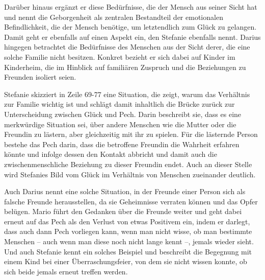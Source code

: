 Darüber hinaus ergänzt er diese Bedürfnisse, die der Mensch aus seiner Sicht hat und nennt die Geborgenheit als zentralen Bestandteil der emotionalen Befindlichkeit, die der Mensch benötige, um letztendlich zum Glück zu gelangen. 
Damit geht er ebenfalls auf einen Aspekt ein, den Stefanie ebenfalls nennt. 
Darius hingegen betrachtet die Bedürfnisse des Menschen aus der Sicht derer, die eine solche Familie nicht besitzen. 
Konkret bezieht er sich dabei auf Kinder im Kinderheim, die im Hinblick auf familiären Zuspruch und die Beziehungen zu Freunden isoliert seien.
 
Stefanie skizziert in Zeile 69-77 eine Situation, die zeigt, warum das Verhältnis zur Familie wichtig ist und schlägt damit inhaltlich die Brücke zurück zur Unterscheidung zwischen Glück und Pech. 
Darin beschreibt sie, dass es eine merkwürdige Situation sei, über andere Menschen wie die Mutter oder die Freundin zu lästern, aber gleichzeitig mit ihr zu spielen. 
Für die lästernde Person bestehe das Pech darin, dass die betroffene Freundin die Wahrheit erfahren könnte und infolge dessen den Kontakt abbricht und damit auch die zwischenmenschliche Beziehung zu dieser Freundin endet. 
Auch an dieser Stelle wird Stefanies Bild vom Glück im Verhältnis von Menschen zueinander deutlich. 

Auch Darius nennt eine solche Situation, in der Freunde einer Person sich als falsche Freunde herausstellen, da sie Geheimnisse verraten können und das Opfer belügen.
Mario führt den Gedanken über die Freunde weiter und geht dabei erneut auf das Pech als den Verlust von etwas Positivem ein, indem er darlegt, dass auch dann Pech vorliegen kann, wenn man nicht wisse, ob man bestimmte Menschen -- auch wenn man diese noch nicht lange kennt --, jemals wieder sieht. 
Und auch Stefanie kennt ein solches Beispiel und beschreibt die Begegnung mit einem Kind bei einer Überraschungsfeier, von dem sie nicht wissen konnte, ob sich beide jemals erneut treffen werden.

